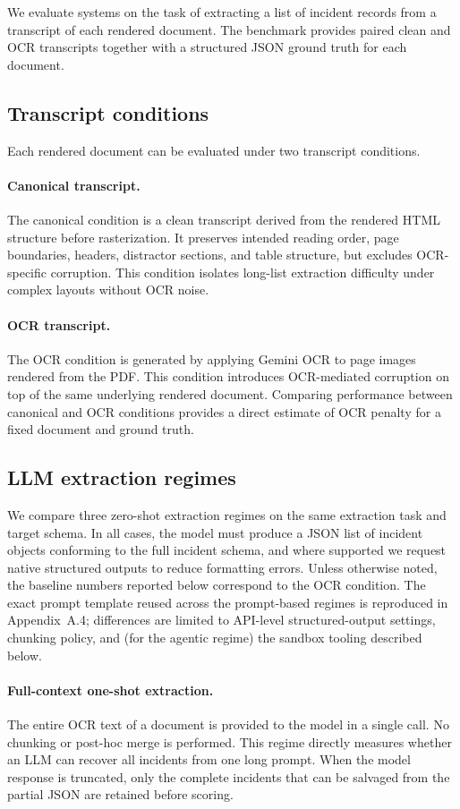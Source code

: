 We evaluate systems on the task of extracting a list of incident records from a transcript of each rendered document. The benchmark provides paired clean and OCR transcripts together with a structured JSON ground truth for each document.

\subsection{Transcript conditions}
Each rendered document can be evaluated under two transcript conditions.

\paragraph{Canonical transcript.}
The canonical condition is a clean transcript derived from the rendered HTML structure before rasterization. It preserves intended reading order, page boundaries, headers, distractor sections, and table structure, but excludes OCR-specific corruption. This condition isolates long-list extraction difficulty under complex layouts without OCR noise.

\paragraph{OCR transcript.}
The OCR condition is generated by applying Gemini OCR to page images rendered from the PDF. This condition introduces OCR-mediated corruption on top of the same underlying rendered document. Comparing performance between canonical and OCR conditions provides a direct estimate of OCR penalty for a fixed document and ground truth.

\subsection{LLM extraction regimes}
We compare three zero-shot extraction regimes on the same extraction task and target schema. In all cases, the model must produce a JSON list of incident objects conforming to the full incident schema, and where supported we request native structured outputs to reduce formatting errors. Unless otherwise noted, the baseline numbers reported below correspond to the OCR condition. The exact prompt template reused across the prompt-based regimes is reproduced in Appendix~A.4; differences are limited to API-level structured-output settings, chunking policy, and (for the agentic regime) the sandbox tooling described below.

\paragraph{Full-context one-shot extraction.}
The entire OCR text of a document is provided to the model in a single call. No chunking or post-hoc merge is performed. This regime directly measures whether an LLM can recover all incidents from one long prompt. When the model response is truncated, only the complete incidents that can be salvaged from the partial JSON are retained before scoring.

